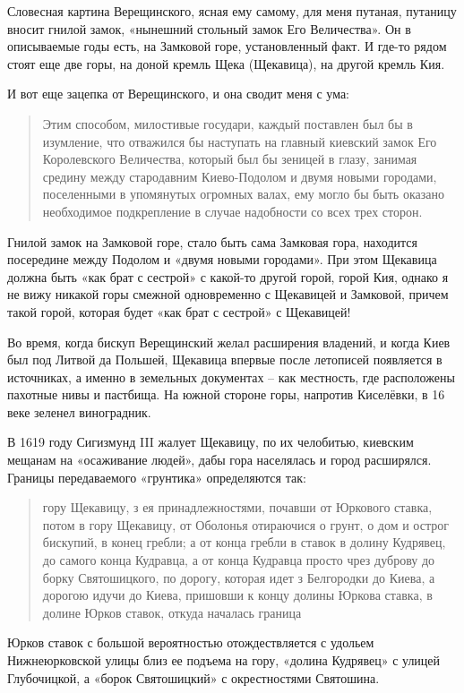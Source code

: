 Словесная картина Верещинского, ясная ему самому, для меня путаная, путаницу вносит гнилой замок, «нынешний стольный замок Его Величества». Он в описываемые годы есть, на Замковой горе, установленный факт. И где-то рядом стоят еще две горы, на доной кремль Щека (Щекавица), на другой кремль Кия.

И вот еще зацепка от Верещинского, и она сводит меня с ума:

\begin{quotation}
Этим способом, милостивые государи, каждый поставлен был бы в изумление, что отважился бы наступать на главный киевский замок Его Королевского Величества, который был бы зеницей в глазу, занимая средину между стародавним Киево-Подолом и двумя новыми городами, поселенными в упомянутых огромных валах, ему могло бы быть оказано необходимое подкрепление в случае надобности со всех трех сторон.
\end{quotation}

Гнилой замок на Замковой горе, стало быть сама Замковая гора, находится посередине между Подолом и «двумя новыми городами». При этом Щекавица должна быть «как брат с сестрой» с какой-то другой горой, горой Кия, однако я не вижу никакой горы смежной одновременно с Щекавицей и Замковой, причем такой горой, которая будет «как брат с сестрой» с Щекавицей!

Во время, когда бискуп Верещинский желал расширения владений, и когда Киев был под Литвой да Польшей, Щекавица впервые после летописей появляется в источниках, а именно в земельных документах – как местность, где расположены пахотные нивы и пастбища. На южной стороне горы, напротив Киселёвки, в 16 веке зеленел виноградник.

В 1619 году Сигизмунд III жалует Щекавицу, по их челобитью, киевским мещанам на «осаживание людей», дабы гора населялась и город расширялся. Границы передаваемого «грунтика» определяются так:

\begin{quotation}
гору Щекавицу, з ея принадлежностями, почавши от Юркового ставка, потом в гору Щекавицу, от Оболонья отираючися о грунт, о дом и острог бискупий, в конец гребли; а от конца гребли в ставок в долину Кудрявец, до самого конца Кудравца, а от конца Кудравца просто чрез дуброву до борку Святошицкого, по дорогу, которая идет з Белгородки до Киева, а дорогою идучи до Киева, пришовши к концу долины Юркова ставка, в долине Юрков ставок, откуда началась граница
\end{quotation}

Юрков ставок с большой вероятностью отождествляется с удольем Нижнеюрковской улицы близ ее подъема на гору, «долина Кудрявец» с улицей Глубочицкой, а «борок Святошицкий» с окрестностями Святошина.

